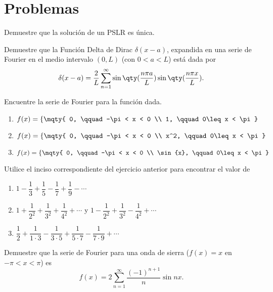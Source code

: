 \pagebreak


\section*{Problemas}



\begin{ejercicio}
	Demuestre que la solución de un PSLR es única.
\end{ejercicio}





\begin{ejercicio}
	Demuestre que la Función Delta de Dirac $\delta (x - a)$, expandida en una serie de Fourier en el medio intervalo $(0,L)$ (con $0 < a < L$) está dada por
		$$ \delta (x - a) = \frac{2}{L} \sum _{n = 1} ^\infty \sin{\qty(\frac{n\pi a}{L})} \sin{\qty(\frac{n\pi x}{L})}. $$
\end{ejercicio}





\begin{ejercicio}
	Encuentre la serie de Fourier para la función dada.
	\begin{enumerate}
		\item $ f(x) = \left\{ \mqty{ 0, \qquad -\pi < x < 0 \\ 1, \qquad 0\leq x < \pi } \right. $
		\item $ f(x) = \left\{ \mqty{ 0, \qquad -\pi < x < 0 \\ x^2, \qquad 0\leq x < \pi } \right. $
		\item $ f(x) = \left\{ \mqty{ 0, \qquad -\pi < x < 0 \\ \sin{x}, \qquad 0\leq x < \pi } \right. $
	\end{enumerate}
\end{ejercicio}



\begin{ejercicio}
	Utilice el inciso correspondiente del ejercicio anterior para encontrar el valor de
	\begin{enumerate}
		\item $1 - \dfrac{1}{3} + \dfrac{1}{5} - \dfrac{1}{7} + \dfrac{1}{9} - \cdots$
		\item $1 + \dfrac{1}{2^2} + \dfrac{1}{3^2} + \dfrac{1}{4^2} + \cdots$ y $1 - \dfrac{1}{2^2} + \dfrac{1}{3^2} - \dfrac{1}{4^2} + \cdots$
		\item $\dfrac{1}{2} + \dfrac{1}{1\cdot 3} - \dfrac{1}{3\cdot 5} + \dfrac{1}{5\cdot 7} - \dfrac{1}{7\cdot 9} + \cdots$
	\end{enumerate}
\end{ejercicio}




\begin{ejercicio}
	Demuestre que la serie de Fourier para una onda de sierra ($f(x) = x$ en $-\pi < x < \pi$) es
		$$ f(x) = 2\sum _{n = 1} ^\infty \frac{(-1)^{n + 1}}{n} \sin{nx}. $$
\end{ejercicio}











